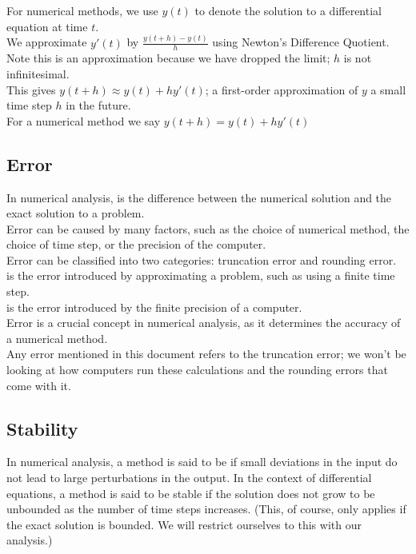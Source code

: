 \par For numerical methods, we use $y(t)$ to denote the solution to a differential equation at time $t$.\\
We approximate $y'(t)$ by $\frac{y(t+h) - y(t)}{h}$ using Newton's Difference Quotient.\\
Note this is an approximation because we have dropped the limit; $h$ is not infinitesimal.\\
This gives $y(t + h) \approx y(t) + h y'(t)$; a first-order approximation of $y$ a small time step $h$ in the future.\\
For a numerical method we say $y(t + h) = y(t) + h y'(t)$ 

\subsection{Error}
\par In numerical analysis,  is the difference between the numerical solution and the exact solution to a problem.\\
Error can be caused by many factors, such as the choice of numerical method, the choice of time step, or the precision of the computer.\\
Error can be classified into two categories: truncation error and rounding error.\\
 is the error introduced by approximating a problem, such as using a finite time step.\\
 is the error introduced by the finite precision of a computer.\\
Error is a crucial concept in numerical analysis, as it determines the accuracy of a numerical method.\\
Any error mentioned in this document refers to the truncation error; we won't be looking at how computers run these calculations and the rounding errors that come with it.

\subsection{Stability}
\par In numerical analysis, a method is said to be  if small deviations in the input do not lead to large perturbations in the output.
In the context of differential equations, a method is said to be stable if the solution does not grow to be unbounded as the number of time steps increases. (This, of course, only applies if the exact solution is bounded. We will restrict ourselves to this with our analysis.)


